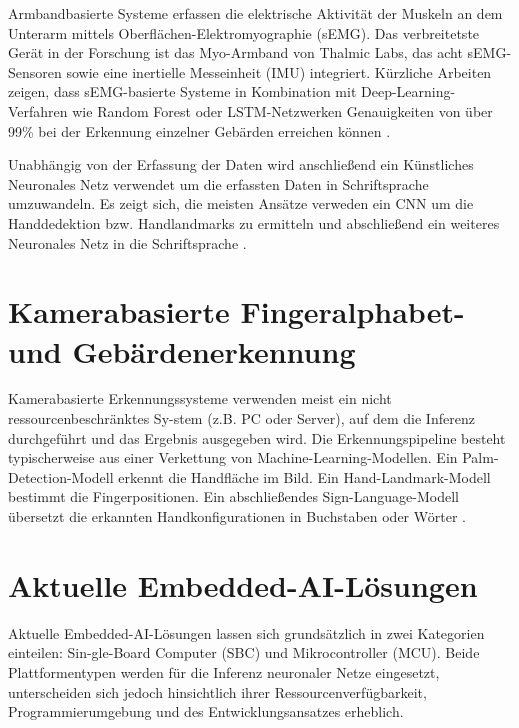 Armbandbasierte Systeme erfassen die elektrische Aktivität der Muskeln an dem Unterarm mittels Oberflächen-Elektromyographie (sEMG). Das verbreitetste Gerät in der Forschung ist das Myo-Armband von Thalmic Labs, das acht sEMG-Sensoren sowie eine inertielle Messeinheit (IMU) integriert. Kürzliche Arbeiten zeigen, dass sEMG-basierte Systeme in Kombination mit Deep-Learning-Verfahren wie Random Forest oder LSTM-Netzwerken Genauigkeiten von über 99\% bei der Erkennung einzelner Gebärden erreichen können \cite{umutNovelWearableSystem2024}.

Unabhängig von der Erfassung der Daten wird anschließend ein Künstliches Neuronales Netz verwendet um die erfassten Daten in Schriftsprache umzuwandeln. Es zeigt sich, die meisten Ansätze verweden ein CNN um die Handdedektion bzw. Handlandmarks zu ermitteln und abschließend ein weiteres Neuronales Netz in die Schriftsprache \cite{rastgooSignLanguageRecognition2021}.

\section{Kamerabasierte Fingeralphabet- und Gebärdenerkennung}\label{sec:kamerabasierte-erkennung}

Kamerabasierte Erkennungssysteme verwenden meist ein nicht ressourcenbeschränktes Sy-stem (z.B. PC oder Server), auf dem die Inferenz durchgeführt und das Ergebnis ausgegeben wird. Die Erkennungspipeline besteht typischerweise aus einer Verkettung von Machine-Learning-Modellen. Ein Palm-Detection-Modell erkennt die Handfläche im Bild. Ein Hand-Landmark-Modell bestimmt die Fingerpositionen. Ein abschließendes Sign-Language-Modell übersetzt die erkannten Handkonfigurationen in Buchstaben oder Wörter \cite{OnDeviceRealTimeHand}.

\section{Aktuelle Embedded-AI-Lösungen}\label{sec:embedded-ai-loesungen}

Aktuelle Embedded-AI-Lösungen lassen sich grundsätzlich in zwei Kategorien einteilen: Sin-gle-Board Computer (SBC) und Mikrocontroller (MCU). Beide Plattformentypen werden für die Inferenz neuronaler Netze eingesetzt, unterscheiden sich jedoch hinsichtlich ihrer Ressourcenverfügbarkeit, Programmierumgebung und des Entwicklungsansatzes erheblich.

